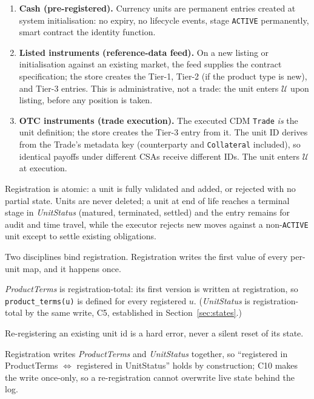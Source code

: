 \documentclass[11pt,a4paper]{article}
\begin{document}
\begin{enumerate}
\item \textbf{Cash (pre-registered).} Currency units are permanent entries created at system initialisation: no expiry, no lifecycle events, stage \texttt{ACTIVE} permanently, smart contract the identity function.
\item \textbf{Listed instruments (reference-data feed).} On a new listing or initialisation against an existing market, the feed supplies the contract specification; the store creates the Tier-1, Tier-2 (if the product type is new), and Tier-3 entries. This is administrative, not a trade: the unit enters $\mathcal{U}$ upon listing, before any position is taken.
\item \textbf{OTC instruments (trade execution).} The executed CDM \texttt{Trade} \emph{is} the unit definition; the store creates the Tier-3 entry from it. The unit ID derives from the Trade's metadata key (counterparty and \texttt{Collateral} included), so identical payoffs under different CSAs receive different IDs. The unit enters $\mathcal{U}$ at execution.
\end{enumerate}

Registration is atomic: a unit is fully validated and added, or rejected with no partial state. Units are never deleted; a unit at end of life reaches a terminal stage in \emph{UnitStatus} (matured, terminated, settled) and the entry remains for audit and time travel, while the executor rejects new moves against a non-\texttt{ACTIVE} unit except to settle existing obligations.

Two disciplines bind registration. Registration writes the first value of every per-unit map, and it happens once.

\begin{condition}
\label{cond:C7}
\sloppy
\emph{ProductTerms} is registration-total: its first version is written at registration, so \texttt{product\_terms(u)} is defined for every registered $u$. (\emph{UnitStatus} is registration-total by the same write, C5, established in Section~\ref{sec:states}.)
\end{condition}

\begin{condition}[C10: no re-registration]
\label{cond:C10}
Re-registering an existing unit id is a hard error, never a silent reset of its state.
\end{condition}

Registration writes \emph{ProductTerms} and \emph{UnitStatus} together, so ``registered in ProductTerms $\iff$ registered in UnitStatus'' holds by construction; C10 makes the write once-only, so a re-registration cannot overwrite live state behind the log.
\end{document}
